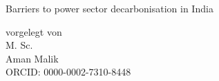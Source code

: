 \documentclass[a4paper,twoside,12pt,openright]{book}
\def\biblio{} %
\begin{document}
\def\biblio{}
\frontmatter %


\pagestyle{empty}


\onecolumn

\begin{comment}
\hbox{%
	\hspace*{0.15\textwidth}%
	\rule{1pt}{.99\textheight}
	\hspace*{0.05\textwidth}%
	\parbox[b][.99\textheight]{0.85\textwidth}{%
		\vspace*{\fill}
\end{comment}


		\begin{center}
		\noindent \Huge%
		Barriers to power sector decarbonisation in India
	
		\vspace*{\fill}
		\vspace*{\fill}
		\vspace*{\fill}
	\end{center}
		\begin{center}
		
		vorgelegt von\\
		M. Sc.\\
		Aman Malik\\
		ORCID: 0000-0002-7310-8448
		\end{center}
	
\end{document}
